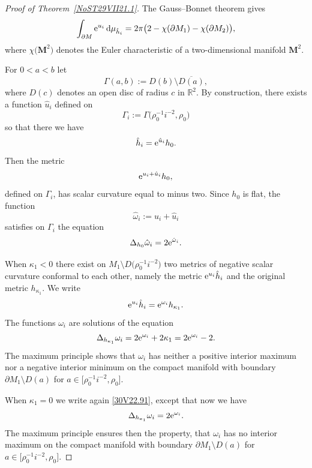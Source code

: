 \documentclass[pdftex]{sigma}
\numberwithin{equation}{section}
\newcommand{\twodimN}{\purple{\mathbf{M}^2}}
\newcommand{\hhi}{{\red{\hat h_{i}}}}
\newcommand{\zui}{{\red{\hat u_{i}}}}
\newcommand{\hato}{\red{\omega}}
\newcommand{\hmv}{\red{\hat \omega}}
\newcommand{\rhozero}{\red{\rho_0}}
\newcommand{\purple}[1]{{\color{purple}#1}}
\newcommand{\blue}[1]{{\color{blue}#1}}
\newcommand{\red}[1]{{\color{red}#1}}
\newcommand{\R}{\mathbb R}
\newcommand{\mage}[1]{#1}%
\renewcommand{\red}[1]{#1}
\renewcommand{\blue}[1]{#1}
\renewcommand{\purple}[1]{#1}
\begin{document}
\begin{proof}[Proof of Theorem~\ref{NoST29VII21.1}]
The Gauss--Bonnet theorem gives{\samepage
\begin{equation*}%
 \int_{\partial M } {\rm e}^{u_i} \,{\rm d}\mu_{\hhi }= \red{2\pi}
 \big(
 2-\chi(\partial M_1) - \chi(\partial M_2)
 \big),
\end{equation*}
where $ {\chi}\big(\twodimN\big)$ denotes the Euler characteristic of a two-dimensional manifold $\twodimN$.}

For $0<a<b$ let
\[
\Gamma(a,b) := D(b) \setminus \overline{D(a)},
\]
where $D(c)$ denotes an open disc of radius $c$ in $\R^2$.
By construction,
there exists a function $\zui $ defined
on
\[
 \red{\Gamma_i}:=
 \Gamma\big(\rhozero^{-1} i^{-2}, \rhozero\big)
\]
so that there we have
\begin{equation*}%
 \hhi ={\rm e}^{ \zui } h_0.
\end{equation*}
Then the metric
\[
 {\rm e}^{ u_i+\zui } h_0,
\]
defined on $\red{\Gamma_i}$, has scalar curvature equal to minus two.
Since $h_0$ is flat, the function
\begin{equation*}%
 \hmv_i:= u_i+\zui
\end{equation*}
satisfies on $\red{\Gamma_i}$ the equation
\begin{equation}\label{NoS31VII21.32}
 \Delta_{h_0 }\hmv_i = 2 {\rm e}^{\hmv_i}.
\end{equation}

When $\kappa_{1}<0$ there exist on $M_1\setminus \red{D\big(}\rhozero^{-1} i^{-2}\big)$ two metrics of negative scalar curvature conformal to each other, namely the metric ${\rm e}^{u_i} \hhi $ and the original metric $h_{\kappa_1}$. We write
 \begin{equation}\label{30V22.91}
 {\rm e}^{u_i} \hhi = {\rm e}^{\hato_i} h_{\kappa_1}.
 \end{equation}
 The functions $\hato_i$ are solutions of the equation
%
\begin{equation*}%
 \Delta_{h_{\kappa_1}} \hato_i = 2 {\rm e}^{\hato_i} + 2 \kappa_1 = 2 {\rm e}^{\hato_i} - 2
.
\end{equation*}
%
The maximum principle shows that $\hato_i$ has neither a positive
 interior maximum nor a negative interior minimum on the compact manifold with boundary $ \partial M_1 \setminus D(a)$ for $a\in\big[\blue{\rhozero^{-1} i^{-2}},\rho_0\big]$.

When $\kappa_{1}=0$
we write again \eqref{30V22.91}, except that now we have
\begin{equation*}%
 \Delta_{h_{\kappa_1}} \hato_i = 2 {\rm e}^{\hato_i}.
\end{equation*}
The maximum principle ensures then the property, that $\hato_i$ has no interior \mage{maximum} on the compact manifold with boundary $ \partial M_1 \setminus D(a)$ for $a\in\big[\blue{\rhozero^{-1} i^{-2}},\rho_0\big]$.


\end{proof}
\end{document}
